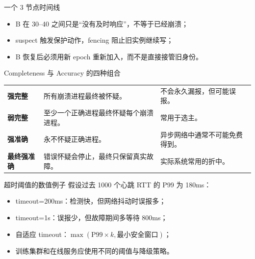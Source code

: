 \documentclass[UTF8,fontset=none,aspectratio=169,10pt]{beamer}
\begin{document}
\begin{frame}{一个 3 节点时间线}
\begin{center}
\end{center}
\begin{itemize}
  \item B 在 30--40 之间只是“没有及时响应”，不等于已经崩溃；
  \item suspect 触发保护动作，fencing 阻止旧实例继续写；
  \item B 恢复后必须用新 epoch 重新加入，而不是直接接管旧身份。
\end{itemize}
\end{frame}

\begin{frame}{Completeness 与 Accuracy 的四种组合}
\begin{tabularx}{\linewidth}{>{\bfseries}p{3.2cm}XX}
\toprule
强完整 & 所有崩溃进程最终被怀疑。 & 不会永久漏报，但可能误报。 \\
弱完整 & 至少一个正确进程最终怀疑每个崩溃进程。 & 常用于选主。 \\
强准确 & 永不怀疑正确进程。 & 异步网络中通常不可能免费得到。 \\
最终强准确 & 错误怀疑会停止，最终只保留真实故障。 & 实际系统常用的折中。 \\
\bottomrule
\end{tabularx}
\end{frame}

\begin{frame}{超时阈值的数值例子}
假设过去 1000 个心跳 RTT 的 P99 为 180ms：
\begin{itemize}
  \item timeout=200ms：检测快，但网络抖动时误报多；
  \item timeout=1s：误报少，但故障期间多等待 800ms；
  \item 自适应 timeout：$\max(\text{P99}\times k,\text{最小安全窗口})$；
  \item 训练集群和在线服务应使用不同的阈值与降级策略。
\end{itemize}
\vfill
{}
\end{frame}
\end{document}
